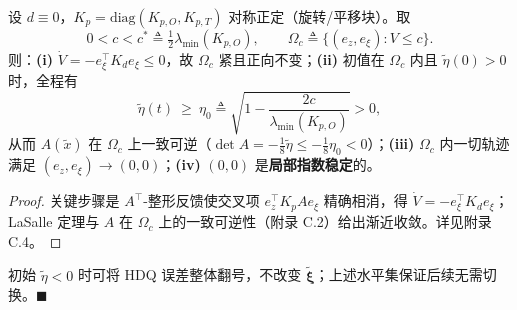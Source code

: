 \renewcommand{\thetheorem}{3(b)}%
\begin{theorem}\label{thm:3b}
设 $d\equiv0$，$K_p=\mathrm{diag}(K_{p,O},K_{p,T})$ 对称正定（旋转/平移块）。取
\begin{equation}
0<c<c^{*}\triangleq\tfrac12\lambda_{\min}(K_{p,O}),
\qquad
\Omega_c\triangleq\{(e_z,e_\xi):V\le c\}.
\tag{5.5b}\label{eq:5.5b}
\end{equation}
则：\textbf{(i)} $\dot V=-e_\xi^\top K_de_\xi\le0$，故 $\Omega_c$ 紧且正向不变；\textbf{(ii)} 初值在 $\Omega_c$ 内且 $\tilde\eta(0)>0$ 时，全程有
\begin{equation}
\tilde\eta(t)\ \ge\ \eta_0\triangleq\sqrt{1-\frac{2c}{\lambda_{\min}(K_{p,O})}}>0 ,
\tag{5.5c}\label{eq:5.5c}
\end{equation}
从而 $A(\tilde x)$ 在 $\Omega_c$ 上一致可逆（$\det A=-\tfrac18\tilde\eta\le-\tfrac18\eta_0<0$）；\textbf{(iii)} $\Omega_c$ 内一切轨迹满足 $(e_z,e_\xi)\to(0,0)$；\textbf{(iv)} $(0,0)$ 是\textbf{局部指数稳定}的。
\end{theorem}

\begin{proof}
关键步骤是 $A^\top$-整形反馈使交叉项 $e_z^\top K_pAe_\xi$ 精确相消，得 $\dot V=-e_\xi^\top K_de_\xi$；LaSalle 定理与 $A$ 在 $\Omega_c$ 上的一致可逆性（附录 C.2）给出渐近收敛。详见附录 C.4。
\end{proof}

\begin{remark}
初始 $\tilde\eta<0$ 时可将 HDQ 误差整体翻号，不改变 $\tilde{\boldsymbol\xi}$；上述水平集保证后续无需切换。$\blacksquare$
\end{remark}

